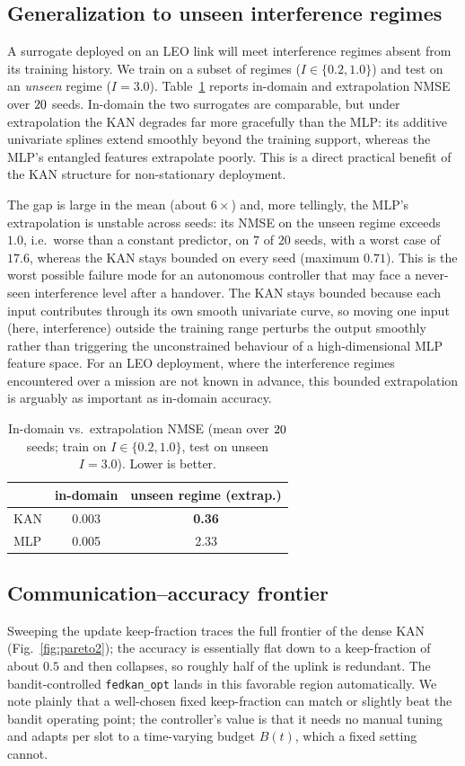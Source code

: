 \documentclass[journal]{IEEEtran}
\newcommand{\genKANin}{0.003}\newcommand{\genKANex}{0.36}
\newcommand{\genMLPin}{0.005}\newcommand{\genMLPex}{2.33}
\begin{document}
\subsection{Generalization to unseen interference regimes}
A surrogate deployed on an LEO link will meet interference regimes absent from its
training history. We train on a subset of regimes ($I\in\{0.2,1.0\}$) and test on
an \emph{unseen} regime ($I=3.0$). Table~\ref{tab:gen} reports in-domain and
extrapolation NMSE over $20$ seeds. In-domain the two surrogates are comparable,
but under extrapolation the KAN degrades far more gracefully than the MLP: its
additive univariate splines extend smoothly beyond the training support, whereas
the MLP's entangled features extrapolate poorly. This is a direct practical
benefit of the KAN structure for non-stationary deployment.

The gap is large in the mean (about $6\times$) and, more tellingly, the MLP's
extrapolation is unstable across seeds: its NMSE on the unseen regime exceeds $1.0$,
i.e.\ worse than a constant predictor, on $7$ of $20$ seeds, with a worst case of
$17.6$, whereas the KAN stays bounded on every seed (maximum $0.71$). This is the
worst possible failure mode for an autonomous controller that may face a never-seen
interference level after a handover. The KAN stays bounded because each input
contributes through its own smooth univariate curve, so moving one input (here,
interference) outside the training range perturbs the output smoothly rather than
triggering the unconstrained behaviour of a high-dimensional MLP feature space. For
an LEO deployment, where the interference regimes encountered over a mission are not
known in advance, this bounded extrapolation is arguably as important as in-domain
accuracy.

\begin{table}[t]
\caption{In-domain vs.\ extrapolation NMSE (mean over $20$ seeds; train on
$I\!\in\!\{0.2,1.0\}$, test on unseen $I\!=\!3.0$). Lower is better.}
\label{tab:gen}
\centering
\begin{tabular}{lcc}
\toprule
 & in-domain & unseen regime (extrap.) \\
\midrule
KAN & \genKANin & \textbf{\genKANex} \\
MLP & \genMLPin & \genMLPex \\
\bottomrule
\end{tabular}
\end{table}

\subsection{Communication--accuracy frontier}
Sweeping the update keep-fraction traces the full frontier of the dense KAN
(Fig.~\ref{fig:pareto2}); the accuracy is essentially flat down to a keep-fraction
of about $0.5$ and then collapses, so roughly half of the uplink is redundant. The
bandit-controlled \texttt{fedkan\_opt} lands in this favorable region
automatically. We note plainly that a well-chosen fixed keep-fraction can match or
slightly beat the bandit operating point; the controller's value is that it needs
no manual tuning and adapts per slot to a time-varying budget $B(t)$, which a fixed
setting cannot.
\end{document}

